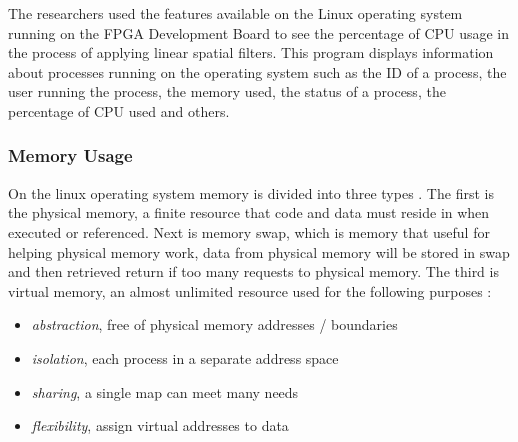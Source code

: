 The researchers used the features available on the Linux operating system running on the FPGA Development Board to see the percentage of CPU usage in the process of applying linear spatial filters. This program displays information about processes running on the operating system such as the ID of a process, the user running the process, the memory used, the status of a process, the percentage of CPU used and others.

\subsubsection{Memory Usage}


On the linux operating system memory is divided into three types \cite{manual:linux}. The first is the physical memory, a finite resource that code and data must reside in when executed or referenced. Next is memory swap, which is memory that useful for helping physical memory work, data from physical memory will be stored in swap and then retrieved return if too many requests to physical memory. The third is virtual memory, an almost unlimited resource used for the following purposes \cite{book:os}:

\begin{itemize} [noitemsep, topsep=0pt]
    \item \textit{abstraction}, free of physical memory addresses / boundaries
    \item \textit{isolation}, each process in a separate address space 
    \item \textit{sharing}, a single map can meet many needs 
    \item \textit{flexibility}, assign virtual addresses to data
\end{itemize}

